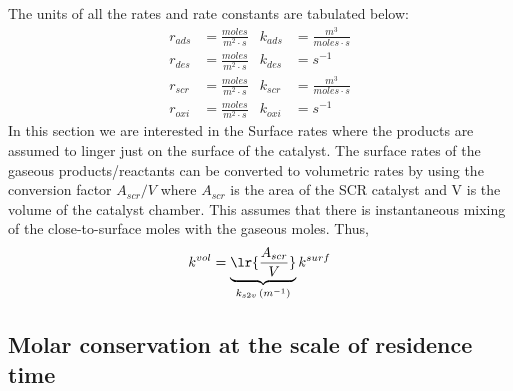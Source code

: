 The units of all the rates and rate constants are tabulated below:
\begin{align*}
    r_{ads} &= \frac{moles}{m^2 \cdot s} &
    k_{ads} &= \frac{m^3}{moles \cdot s} \\
    r_{des} &= \frac{moles}{m^2 \cdot s} &
    k_{des} &= s^{-1} \\
    r_{scr} &= \frac{moles}{m^2 \cdot s} &
    k_{scr} &= \frac{m^3}{moles \cdot s} \\
    r_{oxi} &= \frac{moles}{m^2 \cdot s} &
    k_{oxi} &= s^{-1}
\end{align*}
In this section we are interested in the Surface rates where the products are assumed to linger just on the
surface of the catalyst. The surface rates of the gaseous products/reactants can be converted to volumetric rates by
using the conversion factor $A_{scr}/V$ where $A_{scr}$ is the area of the SCR catalyst and V is the volume of the
catalyst chamber. This assumes that there is instantaneous mixing of the close-to-surface moles with the gaseous moles.
Thus,
\begin{align}
    k^{vol} = \underbrace{\lr{\frac{A_{scr}}{V}}}_{k_{s2v} \, (m^{-1})} k^{surf}
\end{align}
\subsection{Molar conservation at the scale of residence time}

